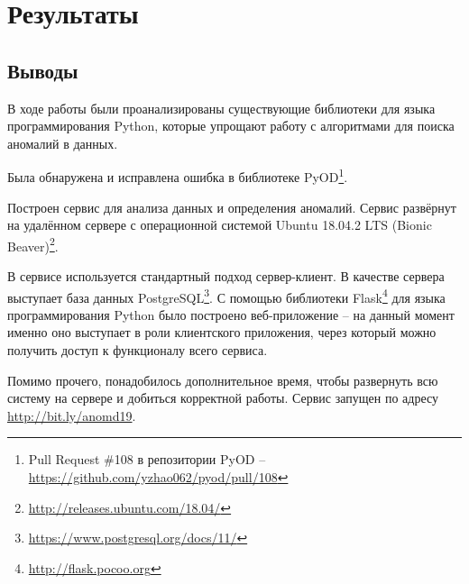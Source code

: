 \chapter{Результаты} \label{ch:ch5}

\section{Выводы} \label{ch:ch4/sect1}

В ходе работы были проанализированы существующие библиотеки для языка программирования Python, которые упрощают работу с алгоритмами для поиска аномалий в данных.

Была обнаружена и исправлена ошибка в библиотеке PyOD\footnote{Pull Request \#108 в репозитории PyOD -- \url{https://github.com/yzhao062/pyod/pull/108}}.

Построен сервис для анализа данных и определения аномалий. Сервис развёрнут на удалённом сервере с операционной системой Ubuntu 18.04.2 LTS (Bionic Beaver)\footnote{\url{http://releases.ubuntu.com/18.04/}}.

В сервисе используется стандартный подход сервер-клиент. В качестве сервера выступает база данных PostgreSQL\footnote{\url{https://www.postgresql.org/docs/11/}}. С помощью библиотеки Flask\footnote{\url{http://flask.pocoo.org}} для языка программирования Python было построено веб-приложение -- на данный момент именно оно выступает в роли клиентского приложения, через который можно получить доступ к функционалу всего сервиса.

Помимо прочего, понадобилось дополнительное время, чтобы развернуть всю систему на сервере и добиться корректной работы. Сервис запущен по адресу \url{http://bit.ly/anomd19}.

\clearpage